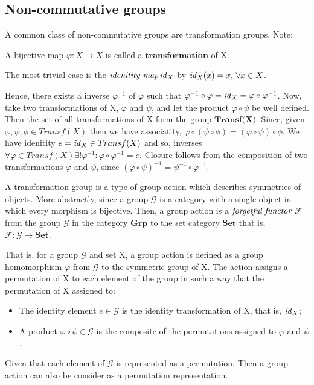 \subsection{Non-commutative groups} %
\label{sec:noncommutative-groups}
A common class of non-commutative groups are transformation groups.
Note:
\begin{defn}[Transformation]
 A bijective map $\varphi: X \to X$ is called a $\textbf{transformation}$ of X.
 \begin{note}
  The most trivial case is the $\emph{idenitity map} \, \mathit{id}_{X}$ by $\mathit{id}_{X}(x) = x, \, \forall x \in X$.
 \end{note}
\end{defn}
Hence, there exists a inverse $\varphi^{-1}$ of $\varphi$ such that
$\varphi^{-1} \circ \varphi = \mathit{id}_{X} = \varphi \circ \varphi^{-1}$. Now, take two transformations of X,
$\varphi$ and $\psi$, and let the product $\varphi \circ \psi$ be well defined. Then the set of all transformations of X form
the group $\textbf{Transf(X)}$. Since, given $\varphi , \psi , \phi \in Transf(X)$ then we have associatity,
$\varphi \circ (\psi \circ \phi) = (\varphi \circ \psi) \circ \phi$. We have idenitity $e = \mathit{id}_{X} \in Transf(X)$ and so,
inverses $\forall \varphi \in Transf(X) \exists ! \varphi^{-1} : \varphi \circ \varphi^{-1} = e$. Closure follows from the composition
of two transformations $\varphi$ and $\psi$, since $(\varphi \circ \psi)^{-1} = \psi^{-1} \circ \varphi^{-1}$.

A transformation group is a type of group action which describes symmetries of objects. More abstractly,
since a group $\mathcal{G}$ is a category with a single object in which every morphism is bijective.
Then, a group action is a $\emph{forgetful functor}$ $\mathcal{F}$ from the group $\mathcal{G}$ in the category $\textbf{Grp}$
to the set category $\textbf{Set}$ that is, $\mathcal{F} : \mathcal{G} \to \textbf{Set}$.

That is, for a group $\mathcal{G}$ and set X, a group action is defined as a group homomorphism $\varphi$
from $\mathcal{G}$ to the symmetric group of X.
The action assigns a permutation of X to each element of the group in such a way that the permutation of X assigned to:
\begin{itemize}
 \item The identity element $e \in \mathcal{G}$ is the identity transformation of X, that is, $\mathit{id}_{X}$;
 \item A product $\varphi \circ \psi \in \mathcal{G}$ is the composite of the permutations assigned to $\varphi$ and $\psi$.
\end{itemize}
Given that each element of $\mathcal{G}$ is represented as a permutation.
Then a group action can also be consider as a permutation representation.

